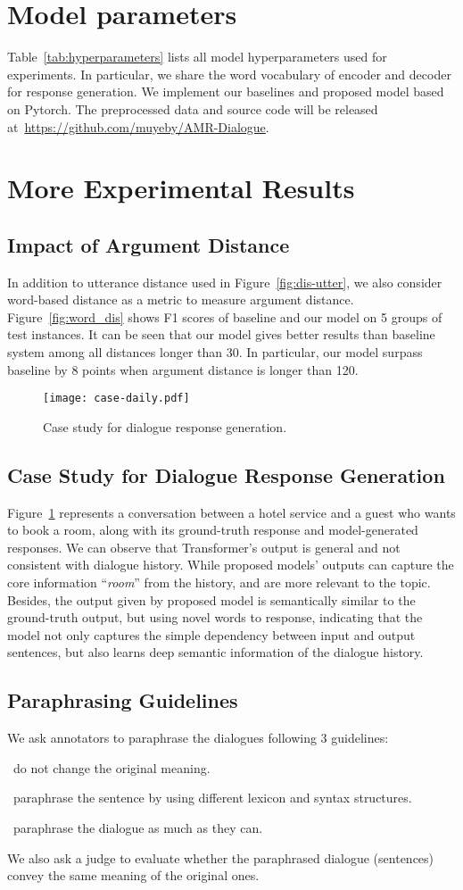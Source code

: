 \documentclass[11pt,a4paper]{article}
\begin{document}
\section{Model parameters}
Table~\ref{tab:hyperparameters} lists all model hyperparameters used for experiments.
In particular, we share the word vocabulary of encoder and decoder for response generation.
We implement our baselines and proposed model based on Pytorch.
The preprocessed data and source code will be released at~\url{https://github.com/muyeby/AMR-Dialogue}.
\section{More Experimental Results}
\subsection{Impact of Argument Distance}
In addition to utterance distance used in Figure~\ref{fig:dis-utter}, we also consider word-based distance as a metric to measure argument distance.
Figure~\ref{fig:word_dis} shows F1 scores of baseline and our model on 5 groups of test instances. 
It can be seen that our model gives better results than baseline system among all distances longer than 30.
In particular, our model surpass baseline by 8 points when argument distance is longer than 120.
\begin{figure}[!ht]
    \centering
    \texttt{[image: case-daily.pdf]}
    \caption{Case study for dialogue response generation.}
    \label{case_daily}
\end{figure}
\subsection{Case Study for Dialogue Response Generation}
\label{sec:caseDRG}
Figure~\ref{case_daily} represents a conversation between a hotel service and a guest who wants to book a room, along with its ground-truth response and model-generated responses.
We can observe that Transformer's output is general and not consistent with dialogue history.
While proposed models' outputs can capture the core information ``\textit{room}'' from the history, and are more relevant to the topic.
Besides, the output given by proposed model is semantically similar to the ground-truth output, but using novel words to response, indicating that the model not only captures the simple dependency between input and output sentences, but also learns deep semantic information of the dialogue history.
\subsection{Paraphrasing Guidelines}
\label{sec:paraph}
We ask annotators to paraphrase the dialogues following 3 guidelines: 

\textbullet~do not change the original meaning. 

\textbullet~paraphrase the sentence by using different lexicon and syntax structures. 

\textbullet~paraphrase the dialogue as much as they can.

We also ask a judge to evaluate whether the paraphrased dialogue (sentences) convey the same meaning of the original ones.
\end{document}
